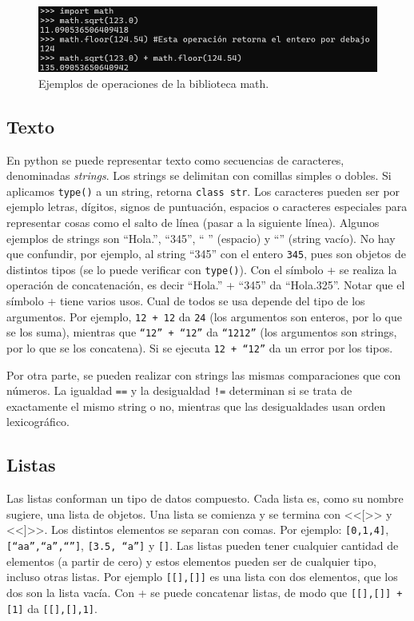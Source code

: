 \documentclass[a4paper, 12pt]{report}
\theoremstyle{definition}
\begin{document}
\begin{figure}
	\centering
	\includegraphics[scale=0.6]{ejemploMath.png}
	\caption{Ejemplos de operaciones de la biblioteca math.}
	\label{fig-ejemploMath}
\end{figure}


\subsection{Texto}

En python se puede representar texto como secuencias de caracteres, denominadas {\sl strings}. Los strings se delimitan con comillas simples o dobles. Si aplicamos {\tt type()} a un string, retorna {\tt class str}. Los caracteres pueden ser por ejemplo letras, dígitos, signos de puntuación, espacios o caracteres especiales para representar cosas como el salto de línea (pasar a la siguiente línea). Algunos ejemplos de strings son ``Hola.'', ``345'', `` '' (espacio)  y ``\hspace{0.1em}'' (string vacío). No hay que confundir, por ejemplo, al string ``345'' con el entero {\tt 345}, pues son objetos de distintos tipos (se lo puede verificar con {\tt type()}). Con el símbolo + se realiza la operación de concatenación, es decir ``Hola.'' + ``345'' da ``Hola.325''. Notar que el símbolo + tiene varios usos. Cual de todos se usa depende del tipo de los argumentos. Por ejemplo, {\tt 12 + 12} da {\tt 24} (los argumentos son enteros, por lo que se los suma), mientras que {\tt ``12'' + ``12''} da {\tt ``1212''} (los argumentos son strings, por lo que se los concatena). Si se ejecuta {\tt 12 + ``12''} da un error por los tipos.

Por otra parte, se pueden realizar con strings las mismas comparaciones que con números. La igualdad {\tt ==} y la desigualdad {\tt !=} determinan si se trata de exactamente el mismo string o no, mientras que las desigualdades usan orden lexicográfico.

\subsection{Listas}

Las listas conforman un tipo de datos compuesto. Cada lista es, como su nombre sugiere, una lista de objetos. Una lista se comienza y se termina con <<[>> y <<]>>. Los distintos elementos se separan con comas. Por ejemplo: {\tt[0,1,4]}, {\tt[``aa'',``a'',``'']}, {\tt [3.5, ``a'']} y {\tt[]}. Las listas pueden tener cualquier cantidad de elementos (a partir de cero) y estos elementos pueden ser de cualquier tipo, incluso otras listas. Por ejemplo {\tt [[],[]]} es una lista con dos elementos, que los dos son la lista vacía. Con + se puede concatenar listas, de modo que {\tt [[],[]] + [1]} da {\tt [[],[],1]}.
\end{document}
